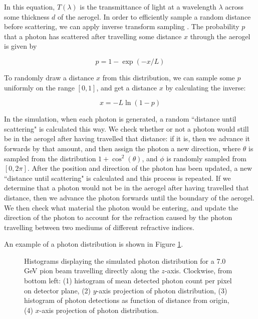In this equation, $T(\lambda)$ is the transmittance of light at a wavelength $\lambda$ across some thickness $d$ of the aerogel.
In order to efficiently sample a random distance before scattering, we can apply inverse transform sampling .
The probability $p$ that a photon has scattered after travelling some distance $x$ through the aerogel is given by

\begin{equation}
p = 1 - \exp(-x/L)
    \label{eq:scatProb}
\end{equation}

To randomly draw a distance $x$ from this distribution, we can sample some $p$ uniformly on the range $[0,1]$, and get a distance $x$ by calculating the inverse:

\begin{equation}
x =   -L\ln(1-p)
  \label{eq:randomScat}
\end{equation}

In the simulation, when each photon is generated, a random ``distance until scattering" is calculated this way. 
We check whether or not a photon would still be in the aerogel after having travelled that distance: if it is, then we advance it forwards by that amount, and then assign the photon a new direction, where $\theta$ is sampled from the distribution $1 + \cos^2(\theta)$, and $\phi$ is randomly sampled from $[0, 2\pi]$.
After the position and direction of the photon has been updated, a new ``distance until scattering" is calculated and this process is repeated. 
If we determine that a photon would not be in the aerogel after having travelled that distance, then we advance the photon forwards until the boundary of the aerogel.
We then check what material the photon would be entering, and update the direction of the photon to account for the refraction caused by the photon travelling between two mediums of different refractive indices.


An example of a photon distribution is shown in Figure \ref{fig:photonHist}.

\begin{figure}[]
\centering
{}
\caption[Example of simulated photon distribution for centered 7.0 GeV pion beam]{Histograms displaying the simulated photon distribution for a 7.0 GeV pion beam travelling directly along the $z$-axis. Clockwise, from bottom left: (1) histogram of mean detected photon count per pixel on detector plane, (2) $y$-axis projection of photon distribution, (3) histogram of photon detections as function of distance from origin, (4) $x$-axis projection of photon distribution. }
\label{fig:photonHist} 
\end{figure}

